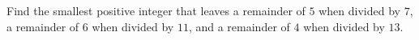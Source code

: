 Find the smallest positive integer that leaves a remainder of $5$ when divided by $7$, a remainder of $6$ when divided by $11$, and a remainder of $4$ when divided by $13$.
